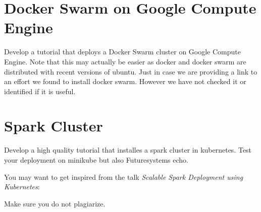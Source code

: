 \section{Docker Swarm on Google Compute Engine}

\begin{exercise}
  Develop a tutorial that deploys a Docker Swarm cluster on Google
  Compute Engine. Note that this may actually be easier as docker
  and docker swarm are distributed with recent versions of
  ubuntu. Just in case we are providing a link to an effort we found
  to install docker swarm. However we have not checked it or
  identified if it is useful.


\end{exercise}

\section{Spark Cluster}

\begin{exercise}

Develop a high quality tutorial that installes a spark cluster in
kubernetes. Test your deployment on minikube but also Futuresystems
echo.

You may want to get inspired from the talk \textit{Scalable Spark
  Deployment using Kubernetes}:


Make sure you do not plagiarize.

\end{exercise}
